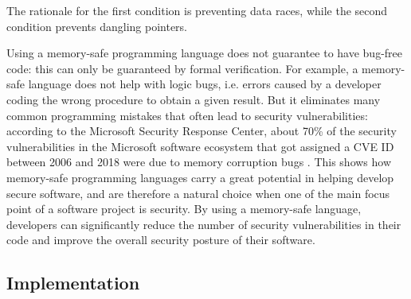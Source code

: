\documentclass{report}
\begin{document}
The rationale for the first condition is preventing data races, while the second condition prevents dangling pointers. \par
Using a memory-safe programming language does not guarantee to have bug-free code: this can only be guaranteed by formal verification. For example, a memory-safe language does not
help with logic bugs, i.e. errors caused by a developer coding the wrong procedure to obtain a given result. But it eliminates many common programming
mistakes that often lead to security vulnerabilities: according to the Microsoft Security Response Center, about 70\% of the security vulnerabilities in the Microsoft software
ecosystem that got assigned a CVE ID \cite{cve_id} between 2006 and 2018 were due to memory corruption bugs \cite{proactive_approach_to_safety}. This shows how memory-safe programming 
languages carry a great potential in helping develop secure software, and are therefore a natural choice when one of the main focus point of a software project is security. By
using a memory-safe language, developers can significantly reduce the number of security vulnerabilities in their code and improve the overall security posture of their software. 

\subsection{Implementation}
\end{document}
